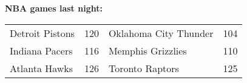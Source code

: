 \textbf{NBA games last night:}
\begin{tabular}{llll}
\toprule
Detroit Pistons & 120 & Oklahoma City Thunder & 104 \\
 Indiana Pacers & 116 &     Memphis Grizzlies & 110 \\
  Atlanta Hawks & 126 &       Toronto Raptors & 125 \\
\bottomrule
\end{tabular}
